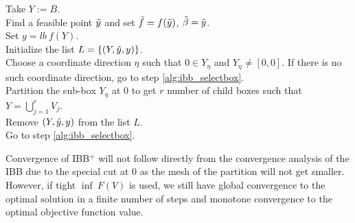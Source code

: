 \documentclass[10pt, letterpaper]{article}
\begin{document}
\begin{algorithm}
\caption{IBB$^{+}$} 
\label{alg:ibb-bbss}
    Take $Y:=B$.\\
    Find a feasible point $\Tilde{y}$ and set $\Tilde{f}=f(\Tilde{y})$, $\Tilde{\beta}=\Tilde{y}$.\\
    Set $y=lb \> f(Y)$. \\
    Initialize the list $L=\{(Y,\Tilde{y},y)\}$. \\
    Choose a coordinate direction $\eta$ such that $0 \in Y_{\eta}$ and $Y_{\eta} \neq [0,0]$. If there is no such coordinate direction, go to step \ref{alg:ibb_selectbox}.\\
    Partition the sub-box $Y_{\eta}$ at $0$ to get $r$ number of child boxes such that $Y=\bigcup\limits_{j=1}^{r} V_{j}$. \label{alg:ibb_partDir} \\
    Remove $(Y,\Tilde{y},y)$ from the list $L$.\\
    Go to step \ref{alg:ibb_selectbox}. \\
\end{algorithm}
Convergence of IBB$^{+}$ will not follow directly from the convergence analysis of the IBB due to the special cut at $0$ as the mesh of the partition will not get smaller. However, if tight $\inf \> F(V)$ is used, we still have global convergence to the optimal solution in a finite number of steps and monotone convergence to the optimal objective function value.
\end{document}
